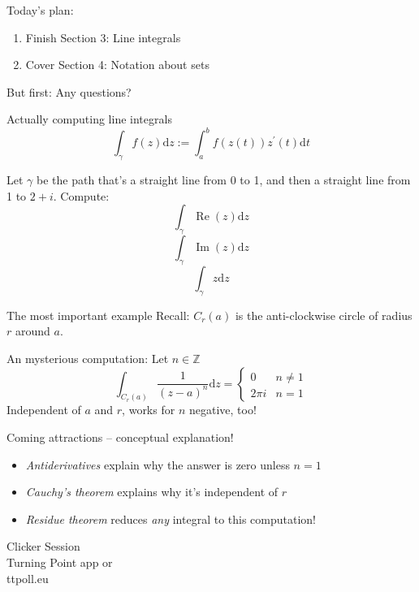 \documentclass{beamer}
\newcommand{\Z}{\mathbb{Z}}
\DeclareMathOperator{\Real}{Re}
\DeclareMathOperator{\Imag}{Im}
\begin{document}
\begin{frame}{Today's plan:}


  \begin{enumerate}
  \item Finish Section 3: Line integrals
  \item Cover Section 4: Notation about sets
  \end{enumerate}

\begin{block}{But first:}
Any questions?
  \end{block}
  \end{frame}

\begin{frame}{Actually computing line integrals}
$$\int_\gamma f(z)\text{d}z := \int_a^b f(z(t))z^\prime(t)\text{d}t$$
\begin{example}
Let $\gamma$ be the path that's a straight line from 0 to 1, and then a straight line from 1 to $2+i$.  Compute:
$$\int_\gamma \Real(z)\text{d}z$$
$$\int_\gamma \Imag(z)\text{d}z$$
$$\int_\gamma z\text{d}z$$
\end{example}
\end{frame}

\begin{frame}{The most important example}
Recall: $C_r(a)$ is the anti-clockwise circle of radius $r$ around $a$.  
\begin{block}{An mysterious computation:}
Let $n\in\Z$
$$\int_{C_r(a)}\frac{1}{(z-a)^n}\text{d}z=\begin{cases} 0 & n\neq 1 \\ 2\pi i & n=1\end{cases}$$
Independent of $a$ and $r$, works for $n$ negative, too!
\end{block}
\begin{block}{Coming attractions -- conceptual explanation!}
\begin{itemize}
    \item \emph{Antiderivatives} explain why the answer is zero unless $n=1$
    \item \emph{Cauchy's theorem} explains why it's independent of $r$
    \item \emph{Residue theorem} reduces \emph{any} integral to this computation!
\end{itemize}

\end{block}
\end{frame}

\begin{frame}
  
\begin{center}

\Huge

Clicker Session \\
Turning Point app or \\
ttpoll.eu 

\end{center}

\end{frame}
\end{document}
